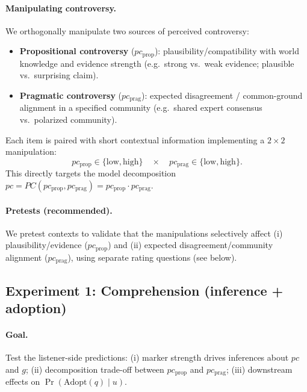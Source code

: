 \documentclass[12pt]{article}
\begin{document}
\paragraph{Manipulating controversy.}
We orthogonally manipulate two sources of perceived controversy:

\begin{itemize}
\item \textbf{Propositional controversy} ($pc_{\text{prop}}$): plausibility/compatibility with world knowledge and evidence strength (e.g.\ strong vs.\ weak evidence; plausible vs.\ surprising claim).
\item \textbf{Pragmatic controversy} ($pc_{\text{prag}}$): expected disagreement / common-ground alignment in a specified community (e.g.\ shared expert consensus vs.\ polarized community).
\end{itemize}

\noindent Each item is paired with short contextual information implementing a $2 \times 2$ manipulation:
\[
pc_{\text{prop}} \in \{\text{low},\text{high}\}
\quad\times\quad
pc_{\text{prag}} \in \{\text{low},\text{high}\}.
\]
This directly targets the model decomposition $pc = PC(pc_{\text{prop}},pc_{\text{prag}})=pc_{\text{prop}}\cdot pc_{\text{prag}}$.

\paragraph{Pretests (recommended).}
We pretest contexts to validate that the manipulations selectively affect (i) plausibility/evidence ($pc_{\text{prop}}$) and (ii) expected disagreement/community alignment ($pc_{\text{prag}}$), using separate rating questions (see below).

\subsection{Experiment 1: Comprehension (inference + adoption)}

\paragraph{Goal.}
Test the listener-side predictions:
(i) marker strength drives inferences about $pc$ and $g$;
(ii) decomposition trade-off between $pc_{\text{prop}}$ and $pc_{\text{prag}}$;
(iii) downstream effects on $\Pr(\mathrm{Adopt}(q)\mid u)$.
\end{document}
